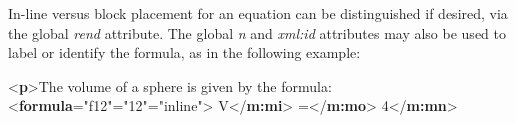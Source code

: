 In-line versus block placement for an equation can be distinguished if desired, via the global {\itshape rend} attribute. The global {\itshape n} and {\itshape xml:id} attributes may also be used to label or identify the formula, as in the following example: \par\bgroup{}\exampleFont \begin{shaded}\noindent\mbox{}{<\textbf{p}>}The volume of a sphere\mbox{}\newline 
 is given by the formula: {<\textbf{formula}\hspace*{1em}{xml:id}="{f12}"\hspace*{1em}{n}="{12}"\hspace*{1em}{rend}="{inline}">}\mbox{}\newline 
\hspace*{1em}\mbox{}\newline 
\hspace*{1em}\hspace*{1em}V{</\textbf{m:mi}>}\mbox{}\newline 
\hspace*{1em}\hspace*{1em}={</\textbf{m:mo}>}\mbox{}\newline 
\hspace*{1em}\hspace*{1em}\mbox{}\newline 
\hspace*{1em}\hspace*{1em}\hspace*{1em}\mbox{}\newline 
\hspace*{1em}\hspace*{1em}\hspace*{1em}\hspace*{1em}4{</\textbf{m:mn}>}\mbox{}\newline 
\hspace*{1em}\hspace*{1em}\hspace*{1em}\mbox{}\newline 

\end{shaded}
